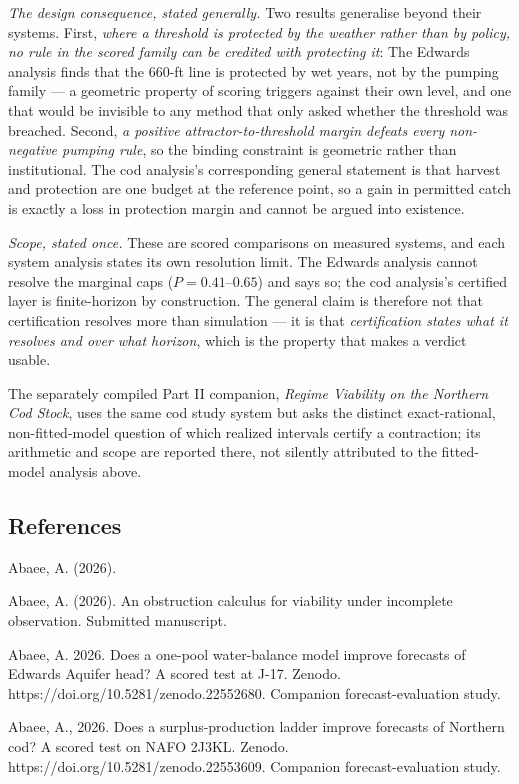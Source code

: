\emph{The design consequence, stated generally.} Two results generalise beyond their systems. First,
\emph{where a threshold is protected by the weather rather than by policy, no rule in the scored
family can be credited with protecting it}: The Edwards analysis finds that the 660-ft line is protected by wet
years, not by the pumping family --- a geometric property of scoring triggers against their own
level, and one that would be invisible to any method that only asked whether the threshold was
breached. Second, \emph{a positive attractor-to-threshold margin defeats every non-negative pumping
rule}, so the binding constraint is geometric rather than institutional. The cod analysis's corresponding
general statement is that harvest and protection are one budget at the reference point, so a gain in
permitted catch is exactly a loss in protection margin and cannot be argued into existence.

\emph{Scope, stated once.} These are scored comparisons on measured systems, and each system analysis states
its own resolution limit. The Edwards analysis cannot resolve the marginal caps ($P = 0.41$--$0.65$) and says so;
the cod analysis's certified layer is finite-horizon by construction. The general claim is therefore not that
certification resolves more than simulation --- it is that \emph{certification states what it
resolves and over what horizon}, which is the property that makes a verdict usable.

\noindent The separately compiled Part II companion, \emph{Regime Viability on the Northern Cod Stock},
uses the same cod study system but asks the distinct exact-rational, non-fitted-model
question of which realized intervals certify a contraction; its arithmetic and scope
are reported there, not silently attributed to the fitted-model analysis above.

\subsection*{References}
\label{references}
Abaee, A. (2026).

Abaee, A. (2026). An obstruction calculus for viability under
incomplete observation. Submitted manuscript.

Abaee, A. 2026. Does a one-pool water-balance model improve forecasts of
Edwards Aquifer head? A scored test at J-17. Zenodo.
https://doi.org/10.5281/zenodo.22552680. Companion forecast-evaluation
study.

Abaee, A., 2026. Does a surplus-production ladder improve forecasts of
Northern cod? A scored test on NAFO 2J3KL. Zenodo.
https://doi.org/10.5281/zenodo.22553609. Companion forecast-evaluation
study.

